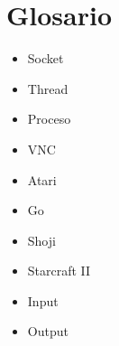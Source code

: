 \section{Glosario}
\begin{itemize}
    \item Socket
    \item Thread
    \item Proceso
    \item VNC
    \item Atari
    \item Go
    \item Shoji
    \item Starcraft II
    \item Input
    \item Output
\end{itemize}